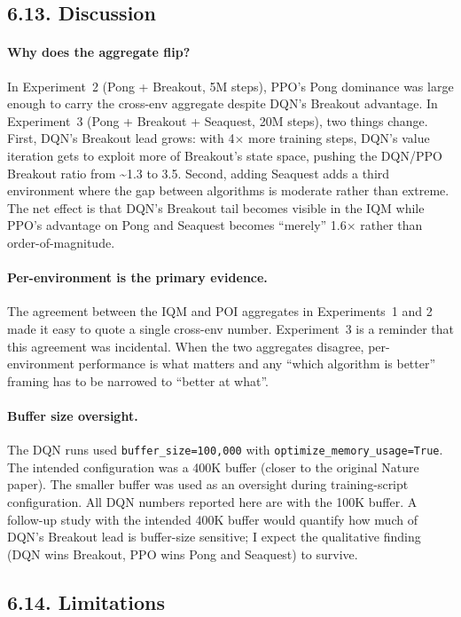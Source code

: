 \documentclass[11pt,a4paper]{article}
\begin{document}
\subsection*{6.13. Discussion}

\paragraph{Why does the aggregate flip?}
In Experiment~2 (Pong + Breakout, 5M steps), PPO's Pong dominance was
large enough to carry the cross-env aggregate despite DQN's Breakout
advantage. In Experiment~3 (Pong + Breakout + Seaquest, 20M steps), two
things change. First, DQN's Breakout lead grows: with 4$\times$ more
training steps, DQN's value iteration gets to exploit more of
Breakout's state space, pushing the DQN/PPO Breakout ratio from
\textasciitilde 1.3 to 3.5. Second, adding Seaquest adds a third
environment where the gap between algorithms is moderate rather than
extreme. The net effect is that DQN's Breakout tail becomes visible in
the IQM while PPO's advantage on Pong and Seaquest becomes ``merely''
1.6$\times$ rather than order-of-magnitude.

\paragraph{Per-environment is the primary evidence.}
The agreement between the IQM and POI aggregates in Experiments~1 and 2
made it easy to quote a single cross-env number. Experiment~3 is a
reminder that this agreement was incidental. When the two aggregates
disagree, per-environment performance is what matters and any ``which
algorithm is better'' framing has to be narrowed to ``better at what''.

\paragraph{Buffer size oversight.}
The DQN runs used \texttt{buffer\_size=100{,}000}
with \texttt{optimize\_memory\_usage=True}. The intended configuration
was a 400K buffer (closer to the original Nature paper). The smaller
buffer was used as an oversight during training-script configuration.
All DQN numbers reported here are with the 100K buffer. A follow-up
study with the intended 400K buffer would quantify how much of DQN's
Breakout lead is buffer-size sensitive; I expect the qualitative
finding (DQN wins Breakout, PPO wins Pong and Seaquest) to survive.

\subsection*{6.14. Limitations}
\end{document}
